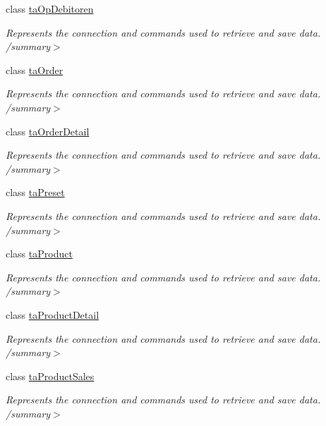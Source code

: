 \begin{DoxyCompactItemize}
class \hyperlink{class_products_1_1_data_1_1ds_sage_table_adapters_1_1ta_op_debitoren}{ta\+Op\+Debitoren}
\begin{DoxyCompactList}\small\item\em Represents the connection and commands used to retrieve and save data. /summary$>$ \end{DoxyCompactList}\item 
class \hyperlink{class_products_1_1_data_1_1ds_sage_table_adapters_1_1ta_order}{ta\+Order}
\begin{DoxyCompactList}\small\item\em Represents the connection and commands used to retrieve and save data. /summary$>$ \end{DoxyCompactList}\item 
class \hyperlink{class_products_1_1_data_1_1ds_sage_table_adapters_1_1ta_order_detail}{ta\+Order\+Detail}
\begin{DoxyCompactList}\small\item\em Represents the connection and commands used to retrieve and save data. /summary$>$ \end{DoxyCompactList}\item 
class \hyperlink{class_products_1_1_data_1_1ds_sage_table_adapters_1_1ta_preset}{ta\+Preset}
\begin{DoxyCompactList}\small\item\em Represents the connection and commands used to retrieve and save data. /summary$>$ \end{DoxyCompactList}\item 
class \hyperlink{class_products_1_1_data_1_1ds_sage_table_adapters_1_1ta_product}{ta\+Product}
\begin{DoxyCompactList}\small\item\em Represents the connection and commands used to retrieve and save data. /summary$>$ \end{DoxyCompactList}\item 
class \hyperlink{class_products_1_1_data_1_1ds_sage_table_adapters_1_1ta_product_detail}{ta\+Product\+Detail}
\begin{DoxyCompactList}\small\item\em Represents the connection and commands used to retrieve and save data. /summary$>$ \end{DoxyCompactList}\item 
class \hyperlink{class_products_1_1_data_1_1ds_sage_table_adapters_1_1ta_product_sales}{ta\+Product\+Sales}
\begin{DoxyCompactList}\small\item\em Represents the connection and commands used to retrieve and save data. /summary$>$ \end{DoxyCompactList}\item 

\end{DoxyCompactItemize}
